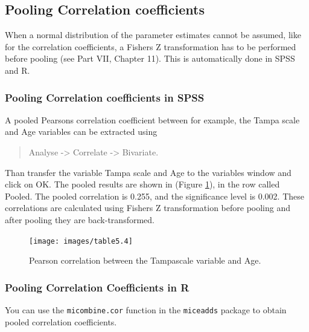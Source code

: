 \documentclass[
]{book}
\begin{document}
\hypertarget{pooling-correlation-coefficients}{%
\subsection{Pooling Correlation coefficients}\label{pooling-correlation-coefficients}}

When a normal distribution of the parameter estimates cannot be assumed, like for the correlation coefficients, a Fishers Z transformation has to be performed before pooling (see Part VII, Chapter 11). This is automatically done in SPSS and R.

\hypertarget{pooling-correlation-coefficients-in-spss}{%
\subsubsection{Pooling Correlation coefficients in SPSS}\label{pooling-correlation-coefficients-in-spss}}

A pooled Pearsons correlation coefficient between for example, the Tampa scale and Age variables can be extracted using

\begin{quote}
Analyse -\textgreater{} Correlate -\textgreater{} Bivariate.
\end{quote}

Than transfer the variable Tampa scale and Age to the variables window and click on OK. The pooled results are shown in (Figure \ref{fig:tab5-4}), in the row called Pooled. The pooled correlation is 0.255, and the significance level is 0.002. These correlations are calculated using Fishers Z transformation before pooling and after pooling they are back-transformed.

\begin{figure}

{\centering \texttt{[image: images/table5.4]} 

}

\caption{Pearson correlation between the Tampascale variable and Age.}\label{fig:tab5-4}
\end{figure}

\hypertarget{pooling-correlation-coefficients-in-r}{%
\subsubsection{Pooling Correlation Coefficients in R}\label{pooling-correlation-coefficients-in-r}}

You can use the \texttt{micombine.cor} function in the \texttt{miceadds} package to obtain pooled correlation coefficients.
\end{document}
